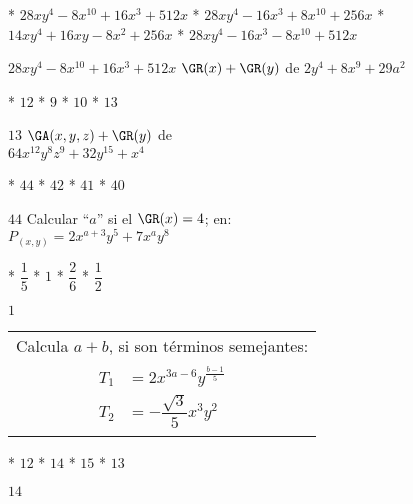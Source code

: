\begin{enum}
  * $28xy^4-8x^{10}+16x^3+512x$
  * $28xy^4-16x^3+8x^{10}+256x$
  * $14xy^4+16xy-8x^2+256x$
  * $28xy^4-16x^3-8x^{10}+512x$
\end{enum}
$28xy^4-8x^{10}+16x^3+512x$
$\GR(x)+\GR(y)$ de $2y^4+8x^9+29a^2$
\begin{enum}
  * $12$
  * $9$
  * $10$
  * $13$
\end{enum}
$13$
$\GA(x,y,z)+\GR(y)$ de \\
$64x^{12}y^8z^9+32y^{15}+x^4$
\begin{enum}
  * $44$
  * $42$
  * $41$
  * $40$
\end{enum}
$44$
Calcular ``$a$'' si el $\GR(x)=4$; en: \\
$P_{(x,y)}=2x^{a+3}y^5+7x^ay^8$
\begin{task}
  * $\dfrac15$
  * $1$
  * $\dfrac26$
  * $\dfrac12$
\end{task}
$1$
\begin{tabular}{c}
  Calcula $a+b$, si son términos semejantes: \\
  $\begin{aligned}
    T_1 &= 2x^{3a-6}y^{\frac{b-1}{5}} \\
    T_2 &= -\dfrac{\sqrt{3}}{5}x^3y^2
  \end{aligned}$
\end{tabular}
\begin{enum}
  * $12$
  * $14$
  * $15$
  * $13$
\end{enum}
$14$

